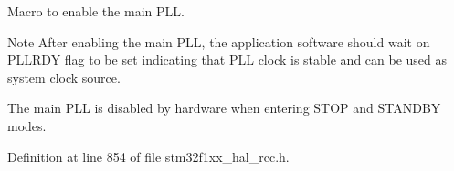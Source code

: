 Macro to enable the main P\+LL. 

\begin{DoxyNote}{Note}
After enabling the main P\+LL, the application software should wait on P\+L\+L\+R\+DY flag to be set indicating that P\+LL clock is stable and can be used as system clock source. 

The main P\+LL is disabled by hardware when entering S\+T\+OP and S\+T\+A\+N\+D\+BY modes. 
\end{DoxyNote}


Definition at line 854 of file stm32f1xx\+\_\+hal\+\_\+rcc.\+h.

